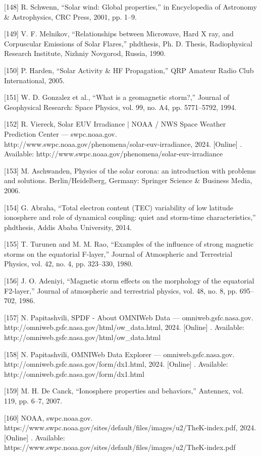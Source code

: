 \documentclass[sn-mathphys-num]{sn-jnl}%
\begin{document}
[148] R. Schwenn, “Solar wind: Global properties,” in Encyclopedia of Astronomy & Astrophysics, CRC Press, 2001, pp. 1–9.

[149] V. F. Melnikov, “Relationships between Microwave, Hard X ray, and Corpuscular Emissions of Solar Flares,” phdthesis, Ph. D. Thesis, Radiophysical Research Institute, Nizhniy Novgorod, Russia, 1990.

[150] P. Harden, “Solar Activity & HF Propagation,” QRP Amateur Radio Club International, 2005.

[151] W. D. Gonzalez et al., “What is a geomagnetic storm?,” Journal of Geophysical Research: Space Physics, vol. 99, no. A4, pp. 5771–5792, 1994.

[152] R. Viereck, Solar EUV Irradiance | NOAA / NWS Space Weather Prediction Center — swpc.noaa.gov. http://www.swpc.noaa.gov/phenomena/solar-euv-irradiance, 2024. [Online] . Available: http://www.swpc.noaa.gov/phenomena/solar-euv-irradiance

[153] M. Aschwanden, Physics of the solar corona: an introduction with problems and solutions. Berlin/Heidelberg, Germany: Springer Science & Business Media, 2006.

[154] G. Abraha, “Total electron content (TEC) variability of low latitude ionosphere and role of dynamical coupling: quiet and storm-time characteristics,” phdthesis, Addis Ababa University, 2014.

[155] T. Turunen and M. M. Rao, “Examples of the influence of strong magnetic storms on the equatorial F-layer,” Journal of Atmospheric and Terrestrial Physics, vol. 42, no. 4, pp. 323–330, 1980.

[156] J. O. Adeniyi, “Magnetic storm effects on the morphology of the equatorial F2-layer,” Journal of atmospheric and terrestrial physics, vol. 48, no. 8, pp. 695–702, 1986.

[157] N. Papitashvili, SPDF - About OMNIWeb Data — omniweb.gsfc.nasa.gov. http://omniweb.gsfc.nasa.gov/html/ow_data.html, 2024. [Online] . Available: http://omniweb.gsfc.nasa.gov/html/ow_data.html

[158] N. Papitashvili, OMNIWeb Data Explorer — omniweb.gsfc.nasa.gov. http://omniweb.gsfc.nasa.gov/form/dx1.html, 2024. [Online] . Available: http://omniweb.gsfc.nasa.gov/form/dx1.html

[159] M. H. De Canck, “Ionosphere properties and behaviors,” Antennex, vol. 119, pp. 6–7, 2007.

[160] NOAA, swpc.noaa.gov. https://www.swpc.noaa.gov/sites/default/files/images/u2/TheK-index.pdf, 2024. [Online] . Available: https://www.swpc.noaa.gov/sites/default/files/images/u2/TheK-index.pdf
\end{document}
